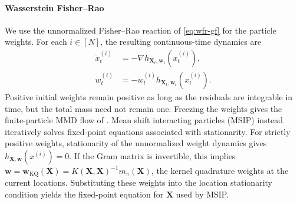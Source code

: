 \paragraph{Wasserstein Fisher--Rao}
We use the unnormalized Fisher--Rao reaction of \eqref{eq:wfr-gf} for the particle weights. For each $i\in[N]$, the resulting continuous-time dynamics are
\begin{align*}\label{eq:wfr-pd}
    \dot{x}_t^{(i)}
    &=-\nabla h_{\bm{X}_t,\bm{w}_t}\left(x_t^{(i)}\right), \\
    \dot{w}_t^{(i)}
    &=-w_t^{(i)}h_{\bm{X}_t,\bm{w}_t}\left(x_t^{(i)}\right). \tag{WFR-PD}
\end{align*}
Positive initial weights remain positive as long as the residuals are integrable in time, but the total mass need not remain one.
Freezing the weights gives the finite-particle MMD flow of \citet{arbel2019maximum}.
Mean shift interacting particles (MSIP) instead iteratively solves fixed-point equations associated with stationarity. For strictly positive weights, stationarity of the unnormalized weight dynamics gives $h_{\bm X,\bm w}(x^{(i)})=0$. If the Gram matrix is invertible, this implies $\bm w=\bm w_{\mathrm{KQ}}(\bm X)=K(\bm X,\bm X)^{-1}m_\pi(\bm X)$, the kernel quadrature weights at the current locations. Substituting these weights into the location stationarity condition yields the fixed-point equation for $\bm X$ used by MSIP.


